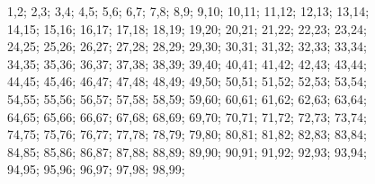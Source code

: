 \documentclass[a4paper,10pt,ngerman]{scrartcl}
\begin{document}
\begin{algorithm}[H]
\begin{figure}[!h]
{                1,2;
                2,3;
                3,4;
                4,5;
                5,6;
                6,7;
                7,8;
                8,9;
                9,10;
                10,11;
                11,12;
                12,13;
                13,14;
                14,15;
                15,16;
                16,17;
                17,18;
                18,19;
                19,20;
                20,21;
                21,22;
                22,23;
                23,24;
                24,25;
                25,26;
                26,27;
                27,28;
                28,29;
                29,30;
                30,31;
                31,32;
                32,33;
                33,34;
                34,35;
                35,36;
                36,37;
                37,38;
                38,39;
                39,40;
                40,41;
                41,42;
                42,43;
                43,44;
                44,45;
                45,46;
                46,47;
                47,48;
                48,49;
                49,50;
                50,51;
                51,52;
                52,53;
                53,54;
                54,55;
                55,56;
                56,57;
                57,58;
                58,59;
                59,60;
                60,61;
                61,62;
                62,63;
                63,64;
                64,65;
                65,66;
                66,67;
                67,68;
                68,69;
                69,70;
                70,71;
                71,72;
                72,73;
                73,74;
                74,75;
                75,76;
                76,77;
                77,78;
                78,79;
                79,80;
                80,81;
                81,82;
                82,83;
                83,84;
                84,85;
                85,86;
                86,87;
                87,88;
                88,89;
                89,90;
                90,91;
                91,92;
                92,93;
                93,94;
                94,95;
                95,96;
                96,97;
                97,98;
                98,99;
            }

\end{figure}
\end{algorithm}
\end{document}

